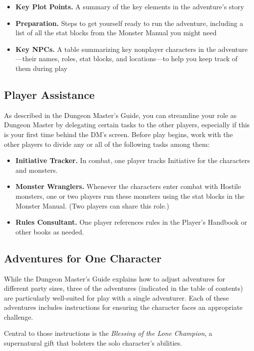 \documentclass[letterpaper, 11pt, twocolumn]{dndbook}
\begin{document}
\begin{itemize}
\item \textbf{Key Plot Points.} A summary of the key elements in the adventure's story
\item \textbf{Preparation.} Steps to get yourself ready to run the adventure, including a list of all the stat blocks from the Monster Manual you might need
\item \textbf{Key NPCs.} A table summarizing key nonplayer characters in the adventure---their names, roles, stat blocks, and locations---to help you keep track of them during play
\end{itemize}

\subsection{Player Assistance}

As described in the Dungeon Master's Guide, you can streamline your role as Dungeon Master by delegating certain tasks to the other players, especially if this is your first time behind the DM's screen. Before play begins, work with the other players to divide any or all of the following tasks among them:

\begin{itemize}
\item \textbf{Initiative Tracker.} In combat, one player tracks Initiative for the characters and monsters.
\item \textbf{Monster Wranglers.} Whenever the characters enter combat with Hostile monsters, one or two players run these monsters using the stat blocks in the Monster Manual. (Two players can share this role.)
\item \textbf{Rules Consultant.} One player references rules in the Player's Handbook or other books as needed.
\end{itemize}

\subsection{Adventures for One Character}

While the Dungeon Master's Guide explains how to adjust adventures for different party sizes, three of the adventures (indicated in the table of contents) are particularly well-suited for play with a single adventurer. Each of these adventures includes instructions for ensuring the character faces an appropriate challenge.

Central to those instructions is the \textit{Blessing of the Lone Champion}, a supernatural gift that bolsters the solo character's abilities.
\end{document}
